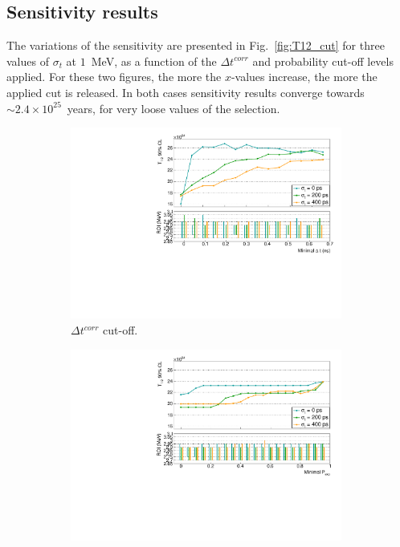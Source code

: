 \subsection{Sensitivity results}

The variations of the sensitivity are presented in Fig.~\ref{fig:T12_cut} for three values of $\sigma_{t}$ at $1$~MeV, as a function of the $\Delta t^{corr}$ and probability cut-off levels applied.
For these two figures, the more the $x$-values increase, the more the applied cut is released.
In both cases sensitivity results converge towards $\sim2.4\times10^{25}$~years, for very loose values of the selection.
\begin{figure}[!h]
\centering
\begin{subfigure}[t]{1\textwidth}
  \centering
  \includegraphics[width=0.98\textwidth]{timedifference/fig_timediff/compare_sigma_cut_delta_t_T12.pdf}
  \captionsetup{justification=justified}
  \caption{$\Delta t^{corr}$ cut-off.
    \label{subfig:T12_cut_deltat}}
\end{subfigure}
\begin{subfigure}[t]{1\textwidth}
  \centering
  \includegraphics[width=0.98\textwidth]{timedifference/fig_timediff/compare_sigma_cut_proba_T12.pdf}

\end{subfigure}
\end{figure}

